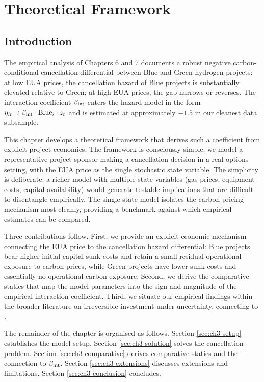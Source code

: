 \chapter{Theoretical Framework}
\label{ch:theory}
\section{Introduction}
\label{sec:ch3-intro}

The empirical analysis of Chapters 6 and 7 documents a robust negative carbon-conditional cancellation differential between Blue and Green hydrogen projects: at low EUA prices, the cancellation hazard of Blue projects is substantially elevated relative to Green; at high EUA prices, the gap narrows or reverses. The interaction coefficient $\beta_{\mathrm{int}}$ enters the hazard model in the form $\eta_{it} \supset \beta_{\mathrm{int}} \cdot \mathrm{Blue}_i \cdot z_t$ and is estimated at approximately $-1.5$ in our cleanest data subsample.

This chapter develops a theoretical framework that derives such a coefficient from explicit project economics. The framework is consciously simple: we model a representative project sponsor making a cancellation decision in a real-options setting, with the EUA price as the single stochastic state variable. The simplicity is deliberate: a richer model with multiple state variables (gas prices, equipment costs, capital availability) would generate testable implications that are difficult to disentangle empirically. The single-state model isolates the carbon-pricing mechanism most cleanly, providing a benchmark against which empirical estimates can be compared.

Three contributions follow. First, we provide an explicit economic mechanism connecting the EUA price to the cancellation hazard differential: Blue projects bear higher initial capital sunk costs and retain a small residual operational exposure to carbon prices, while Green projects have lower sunk costs and essentially no operational carbon exposure. Second, we derive the comparative statics that map the model parameters into the sign and magnitude of the empirical interaction coefficient. Third, we situate our empirical findings within the broader literature on irreversible investment under uncertainty, connecting to \cite{pindyck1991irreversibility, dixit1994investment, bolton2021carbon, odenweller2022probabilistic}.

The remainder of the chapter is organised as follows. Section \ref{sec:ch3-setup} establishes the model setup. Section \ref{sec:ch3-solution} solves the cancellation problem. Section \ref{sec:ch3-comparative} derives comparative statics and the connection to $\beta_{\mathrm{int}}$. Section \ref{sec:ch3-extensions} discusses extensions and limitations. Section \ref{sec:ch3-conclusion} concludes.

